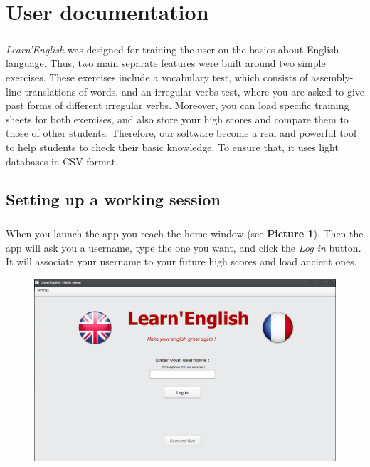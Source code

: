 \documentclass[12pt, a4paper]{report}
\begin{document}
\newpage
\chapter*{User documentation}

\paragraph{}\textit{Learn'English} was designed for training the user on the basics about English language. Thus, two main separate features were built around two simple exercises. These exercises include a vocabulary test, which consists of assembly-line translations of words, and an irregular verbs test, where you are asked to give past forms of different irregular verbs. Moreover, you can load specific training sheets for both exercises, and also store your high scores and compare them to those of other students. Therefore, our software become a real and powerful tool to help students to check their basic knowledge. To ensure that, it uses light databases in CSV format.

\section*{\hspace{0.6cm}Setting up a working session}

\paragraph{}When you launch the app you reach the home window (see \textbf{Picture 1}). Then the app will ask you a username, type the one you want, and click the \textit{Log in} button. It will associate your username to your future high scores and load ancient ones.

\begin{figure}[H]
    \centering
    \includegraphics[scale=0.55]{images/home.png}
\end{figure}
\newpage
\end{document}
